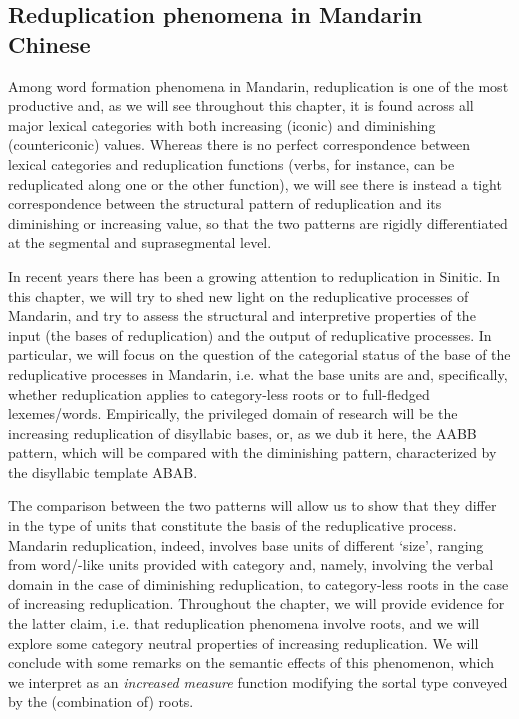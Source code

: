 \documentclass[output=paper]{langsci/langscibook}
\begin{document}
\subsection{Reduplication phenomena in Mandarin Chinese}

Among word formation phenomena in Mandarin, reduplication is one of the
most productive and, as we will see throughout this chapter, it is found
across all major lexical categories with both increasing (iconic) and
diminishing (countericonic) values. Whereas there is no perfect
correspondence between lexical categories and reduplication functions
(verbs, for instance, can be reduplicated along one or the other
function), we will see there is instead a tight correspondence between
the structural pattern of reduplication and its 
diminishing or increasing value, so that the two patterns are rigidly
differentiated at the segmental and suprasegmental level.

In recent years there has been a growing attention to reduplication in
Sinitic. In this chapter, we will try to shed new light on the
reduplicative processes of Mandarin, and try to assess the structural
and interpretive properties of the input (the bases of reduplication)
and the output of reduplicative processes. In particular, we will focus
on the question of the categorial status of the base of the
reduplicative processes in Mandarin, i.e. what the base units are and,
specifically, whether reduplication applies to category-less roots or to
full-fledged lexemes/words. Empirically, the privileged domain of
research will be the increasing reduplication of disyllabic bases, or,
as we dub it here, the AABB pattern, which will be compared with the
diminishing pattern, characterized by the disyllabic template ABAB.

The comparison between the two patterns will allow us to show that they
differ in the type of units that constitute the basis of the
reduplicative process. Mandarin reduplication, indeed, involves base
units of different `size', ranging from word/-like units provided
with category and, namely, involving the verbal domain in the case of
diminishing reduplication, to category-less roots in the case of
increasing reduplication. Throughout the chapter, we will provide
evidence for the latter claim, i.e. that reduplication phenomena involve
roots, and we will explore some category neutral properties of
increasing reduplication. We will conclude with some remarks on the
semantic effects of this phenomenon, which we interpret as an
\emph{increased measure} function modifying the sortal type conveyed by
the (combination of) roots.
\end{document}
